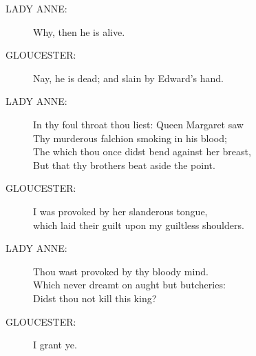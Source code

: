 \documentclass{article}
\begin{document}
\begin{description}
\item[LADY ANNE:] 
\hspace{1pt}Why, then he is alive.\\
\end{description}
\begin{description}
\item[GLOUCESTER:] 
\hspace{1pt}Nay, he is dead; and slain by Edward's hand.\\
\end{description}
\begin{description}
\item[LADY ANNE:] 
\hspace{1pt}In thy foul throat thou liest: Queen Margaret saw\\
\hspace{1pt}Thy murderous falchion smoking in his blood;\\
\hspace{1pt}The which thou once didst bend against her breast,\\
\hspace{1pt}But that thy brothers beat aside the point.\\
\end{description}
\begin{description}
\item[GLOUCESTER:] 
\hspace{1pt}I was provoked by her slanderous tongue,\\
\hspace{1pt}which laid their guilt upon my guiltless shoulders.\\
\end{description}
\begin{description}
\item[LADY ANNE:] 
\hspace{1pt}Thou wast provoked by thy bloody mind.\\
\hspace{1pt}Which never dreamt on aught but butcheries:\\
\hspace{1pt}Didst thou not kill this king?\\
\end{description}
\begin{description}
\item[GLOUCESTER:] 
\hspace{1pt}I grant ye.\\
\end{description}
\end{document}
